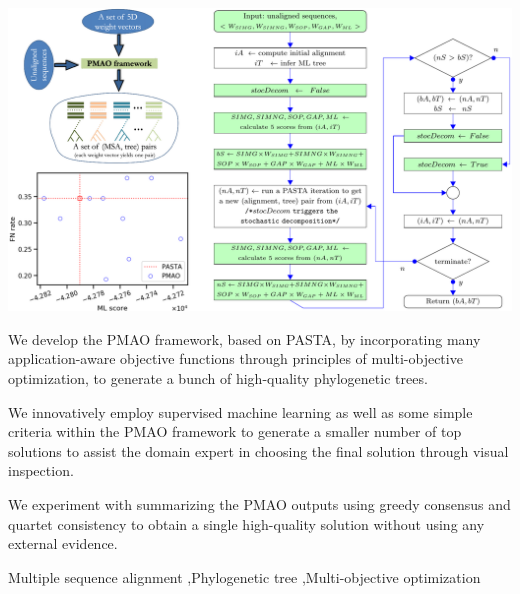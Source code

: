 \documentclass[a4paper,fleqn, review]{cas-dc}
\begin{document}
\begin{graphicalabstract}
	\includegraphics[width=1.0\textwidth]{graphical-abs.pdf}
\end{graphicalabstract}

\begin{highlights}
	\item We develop the PMAO framework, based on PASTA, by incorporating many application-aware objective functions through principles of multi-objective optimization, to generate a bunch of high-quality phylogenetic trees.
	\item We innovatively employ supervised machine learning as well as some simple criteria within the PMAO framework to generate a smaller number of top solutions to assist the domain expert in choosing the final solution through visual inspection.
	\item We experiment with summarizing the PMAO outputs using greedy consensus and quartet consistency to obtain a single high-quality solution without using any external evidence.
\end{highlights}

\begin{keywords}
	Multiple sequence alignment \sep Phylogenetic tree \sep Multi-objective optimization
\end{keywords}



\maketitle
\end{document}
